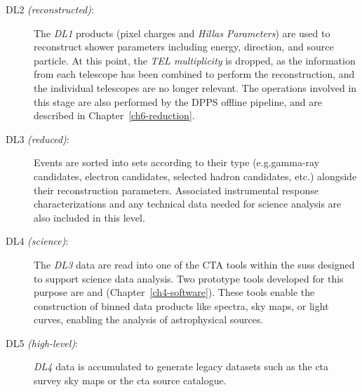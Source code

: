 \begin{description}
\item[DL2 \textit{(reconstructed)}:]
The \textit{DL1} products (pixel charges and \textit{Hillas Parameters}) are used to reconstruct shower parameters including energy, direction, and source particle. At this point, the \textit{TEL multiplicity} is dropped, as the information from each telescope has been combined to perform the reconstruction, and the individual telescopes are no longer relevant. The operations involved in this stage are also performed by the DPPS offline pipeline, and are described in Chapter~\ref{ch6-reduction}.
\item[DL3 \textit{(reduced)}:]
Events are sorted into sets according to their type (e.g.\@ gamma-ray candidates, electron candidates, selected hadron
candidates, etc.) alongside their reconstruction parameters. Associated instrumental response characterizations and any technical data needed for
science analysis are also included in this level.
\item[DL4 \textit{(science)}:]
The \textit{DL3} data are read into one of the CTA tools within the \gls{suss} designed to support science data analysis. Two prototype tools developed for this purpose are  and  (Chapter~\ref{ch4-software}). These tools enable the construction of binned data products like spectra, sky maps, or light curves, enabling the analysis of astrophysical sources.
\item[DL5 \textit{(high-level)}:]
\textit{DL4} data is accumulated to generate legacy datasets such as the \gls{cta} survey sky maps or the \gls{cta} source catalogue.
\end{description}